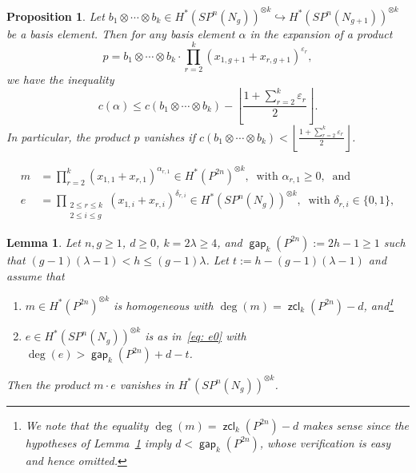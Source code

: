 \documentclass[10pt,a4paper]{amsart}
\newtheorem{proposition}{Proposition}
\newtheorem{lemma}{Lemma}
\DeclareMathOperator{\gap}{{\mathsf{gap}}}
\DeclareMathOperator{\zcl}{{\mathsf{zcl}}}
\begin{document}
\begin{proposition}\label{prop: prop z from notes}
Let $b_1\otimes\cdots\otimes b_k\in H^*(SP^n(N_g))^{\otimes k}\hookrightarrow H^*(SP^n(N_{g+1}))^{\otimes k}$ be a basis element. Then for any basis element $\alpha$ in the expansion of a product
\[
p=b_1\otimes\cdots\otimes b_k\cdot\prod_{r=2}^k\left(x_{1,g+1}+x_{r,g+1}\right)^{\varepsilon_r},
\]
we have the inequality
\[
c(\alpha)\le c\left(b_1\otimes\cdots\otimes b_k\right)-\left\lfloor\frac{1+\sum_{r=2}^k\varepsilon_r}{2}\right\rfloor.
\]
In particular, the product $p$ vanishes if $c(b_1\otimes\cdots\otimes b_k)<\left\lfloor\tfrac{1+\sum_{r=2}^k\varepsilon_r}{2}\right\rfloor$.
\end{proposition}

\begin{align} 
m&=\prod_{r=2}^k\left(x_{1,1}+x_{r,1}\right)^{\alpha_{r,1}} \in H^*(P^{2n})^{\otimes k}, \ \text{ with $\alpha_{r,1}\geq0$},\ \text{ and} \nonumber \\
e&=\prod_{\substack{2\le r\le k\\ 2\le i \le g}}\left(x_{1,i}+x_{r,i}\right)^{\delta_{r,i}} \in H^*(SP^n(N_g))^{\otimes k}, \ \text{ with $\delta_{r,i}\in\{0,1\}$}, \label{eq: e0}   \end{align}

\begin{lemma}\label{prop: final}
    Let $n,g\geq1$, $d\geq0$, $k=2\lambda\ge 4$, and $\gap_k(P^{2n}):=2h-1\geq1$ such that $(g-1)(\lambda-1)<h\le(g-1)\lambda$. Let $t:=h-(g-1)(\lambda-1)$ and assume that
\begin{enumerate}
        \item $m\in H^*(P^{2n})^{\otimes k}$ is homogeneous with $\deg(m)=\zcl_k(P^{2n})-d$, and\hspace{.5mm}\footnote{We note that the equality $\deg(m)=\zcl_k(P^{2n})-d$ makes sense since the hypotheses of Lemma~\ref{prop: final} imply $d<\gap_k(P^{2n})$, whose verification is easy and hence omitted.}
        \item  $e\in H^*(SP^n(N_g))^{\otimes k}$ is as in~\eqref{eq: e0} with $\deg(e)>\gap_k(P^{2n})+d-t$.
    \end{enumerate}
    Then the product $m\cdot e$ vanishes in $H^*(SP^n(N_g))^{\otimes k}$.
\end{lemma}
\end{document}
